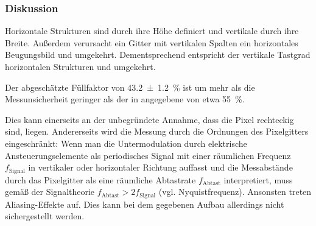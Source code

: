 \documentclass[
	a4paper,
	12pt,
	pagesize,
	ngerman
]{scrartcl}
\begin{document}
			\subsubsection*{Diskussion}
			Horizontale Strukturen sind durch ihre Höhe definiert und vertikale durch ihre Breite.
			Außerdem verursacht ein Gitter mit vertikalen Spalten ein horizontales Beugungsbild und umgekehrt.
			Dementsprechend entspricht der vertikale Tastgrad horizontalen Strukturen und umgekehrt.

			Der abgeschätzte Füllfaktor von \SI{43,2\pm 1,2}{\percent} ist um mehr als die Messunsicherheit geringer als der in \cite{Handbuch} angegebene von etwa \SI{55}{\percent}.

			Dies kann einerseits an der unbegründete Annahme, dass die Pixel rechteckig sind, liegen.
			Andererseits wird die Messung durch die Ordnungen des Pixelgitters eingeschränkt:
			Wenn man die Untermodulation durch elektrische Ansteuerungselemente als periodisches Signal mit einer räumlichen Frequenz $ f_\text{Signal} $ in vertikaler oder horizontaler Richtung auffasst und die Messabstände durch das Pixelgitter als eine räumliche Abtastrate $f_\text{Abtast}$ interpretiert, muss gemäß der Signaltheorie $f_\text{Abtast} > 2 f_\text{Signal}$ (vgl. Nyquistfrequenz).
			Ansonsten treten Aliasing-Effekte auf.
			Dies kann bei dem gegebenen Aufbau allerdings nicht sichergestellt werden.
\end{document}
